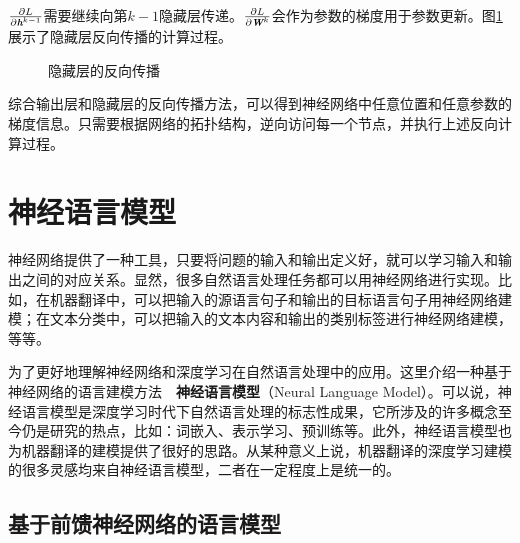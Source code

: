 \parinterval  $ \frac{\partial L}{\partial {\textbf{\em h}}^{k-1}} $需要继续向第$ k-1 $隐藏层传递。$ \frac{\partial L}{\partial {\textbf{\em W}}^k} $会作为参数的梯度用于参数更新。图\ref{fig:9-57}展示了隐藏层反向传播的计算过程。

\begin{figure}[htp]
\centering

\caption{隐藏层的反向传播}
\label{fig:9-57}
\end{figure}

\parinterval  综合输出层和隐藏层的反向传播方法，可以得到神经网络中任意位置和任意参数的梯度信息。只需要根据网络的拓扑结构，逆向访问每一个节点，并执行上述反向计算过程。


\sectionnewpage
\section{神经语言模型}\label{sec9:nlm}

\parinterval  神经网络提供了一种工具，只要将问题的输入和输出定义好，就可以学习输入和输出之间的对应关系。显然，很多自然语言处理任务都可以用神经网络进行实现。比如，在机器翻译中，可以把输入的源语言句子和输出的目标语言句子用神经网络建模；在文本分类中，可以把输入的文本内容和输出的类别标签进行神经网络建模，等等。

\parinterval  为了更好地理解神经网络和深度学习在自然语言处理中的应用。这里介绍一种基于神经网络的语言建模方法\ \dash \ {\small\sffamily\bfseries{神经语言模型}}（Neural Language Model）。可以说，神经语言模型是深度学习时代下自然语言处理的标志性成果，它所涉及的许多概念至今仍是研究的热点，比如：词嵌入、表示学习、预训练等。此外，神经语言模型也为机器翻译的建模提供了很好的思路。从某种意义上说，机器翻译的深度学习建模的很多灵感均来自神经语言模型，二者在一定程度上是统一的。


\subsection{基于前馈神经网络的语言模型}

